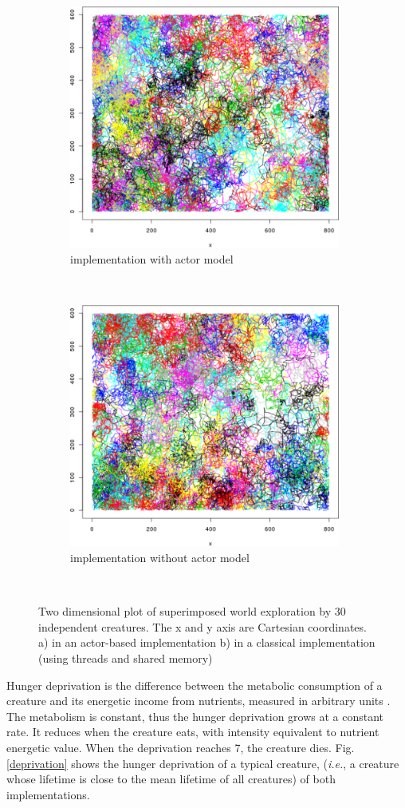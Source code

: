 \documentclass[runningheads]{llncs}
\begin{document}
\begin{figure}[h]
	\centering
	\begin{subfigure}[t]{1\textwidth}
		\centering
		\includegraphics[height=8cm]{tracingAkka}
		\caption{implementation with actor model}
		\label{trace:akka}
	\end{subfigure}%
	\\
	\begin{subfigure}[t]{1\textwidth}
		\centering
		\includegraphics[height=8cm]{tracingNoAkka}
		\caption{implementation without actor model}
		\label{trace:noAkka}
	\end{subfigure}%
	~
	\caption{Two dimensional plot of superimposed world exploration by 30 independent creatures. The x and y axis are Cartesian coordinates. a) in an actor-based implementation b) in a classical implementation (using threads and shared memory)}
	\label{fig:tracing}
\end{figure}


Hunger deprivation is the difference between the metabolic consumption of a creature and its energetic income from nutrients, measured in arbitrary units \cite{Campos}. The metabolism is constant, thus the hunger deprivation grows at a constant rate. It reduces when the creature eats, with intensity equivalent to nutrient energetic value. When the deprivation reaches 7, the creature dies. Fig. \ref{deprivation} shows the hunger deprivation of a typical creature, (\textit{i.e.}, a creature whose lifetime is close to the mean lifetime of all creatures) of both implementations. 
\end{document}
